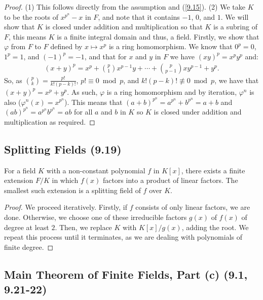 \begin{proof}
    (1) This follows directly from the assumption and (\ref{9.15}).
    \bs
    (2) We take $K$ to be the roots of $x^{p^n} - x$ in $F$, and note that it contains
    $-1$, $0$, and $1$. We will show that $K$ is closed under addition and multiplication
    so that $K$ is a subring of $F$, this means $K$ is a finite integral domain and thus,
    a field. Firstly, we show that $\varphi$ from $F$ to $F$ defined by $x \mapsto x^p$
    is a ring homomorphism. We know that $0^p = 0$, $1^p = 1$, and $(-1)^p = -1$, and that
    for $x$ and $y$ in $F$ we have $(xy)^p = x^py^p$ and:
    \begin{align*}
        (x + y)^p = x^p + \binom{p}{1}x^{p - 1}y + \cdots + \binom{p}{p - 1}xy^{p - 1} + y^p.
    \end{align*} So, as $\binom{p}{k} = \frac{p!}{k!(p-k)!}$, $p! \equiv 0 \bmod p$, and
    $k!(p-k)! \not\equiv 0 \bmod p$, we have that
    \linebreak $(x + y)^p = x^p + y^p$. As such,
    $\varphi$ is a ring homomorphism and by iteration, $\varphi^n$ is also
    ($\varphi^n(x) = x^{p^n}$). This means that $(a + b)^{p^n} = a^{p^n} + b^{p^n} = a + b$
    and $(ab)^{p^n} = a^{p^n}b^{p^n} = ab$ for all $a$ and $b$ in $K$ so $K$ is closed
    under addition and multiplication as required.
\end{proof}

\subsection{Splitting Fields (9.19)} \label{9.19}

For a field $K$ with a non-constant polynomial $f$ in $K[x]$, there exists a finite extension
$F / K$ in which $f(x)$ factors into a product of linear factors. The smallest such
extension is a splitting field of $f$ over $K$.

\begin{proof}
    We proceed iteratively. Firstly, if $f$ consists of only linear factors, we are done.
    Otherwise, we choose one of these irreducible factors $g(x)$ of $f(x)$ of degree at
    least $2$. Then, we replace $K$ with $K[x] / g(x)$, adding the root. We repeat this process
    until it terminates, as we are dealing with polynomials of finite degree.
\end{proof}

\newpage

\subsection{Main Theorem of Finite Fields, Part (c) (9.1, 9.21-22)}
\label{9.1c} \label{9.21} \label{9.22}

